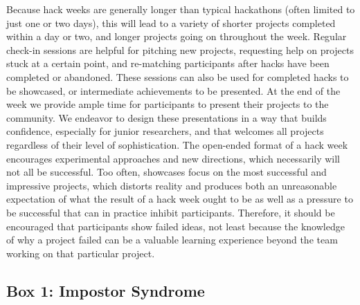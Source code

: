 \documentclass{nature}
\begin{document}
Because hack weeks are generally longer than typical hackathons (often limited to just one or two days), this will lead to a variety of shorter projects completed within a day or two, and longer projects going on throughout the week. Regular check-in sessions are helpful for pitching new projects, requesting help on projects stuck at a certain point, and re-matching participants after hacks have been completed or abandoned. These sessions can also be used for completed hacks to be showcased, or intermediate achievements to be presented. At the end of the week we provide ample time for participants to present their projects to the community. We endeavor to design these presentations in a way that builds confidence, especially for junior researchers, and that welcomes all projects regardless of their level of sophistication. The open-ended format of a hack week encourages experimental approaches and new directions, which necessarily will not all be successful. Too often, showcases focus on the most successful and impressive projects, which distorts reality and produces both an unreasonable expectation of what the result of a hack week ought to be as well as a pressure to be successful that can in practice inhibit participants. Therefore, it should be encouraged that participants show failed ideas, not least because the knowledge of why a project failed can be a valuable learning experience beyond the team working on that particular project.

\subsection{Box 1: Impostor Syndrome}
\end{document}
